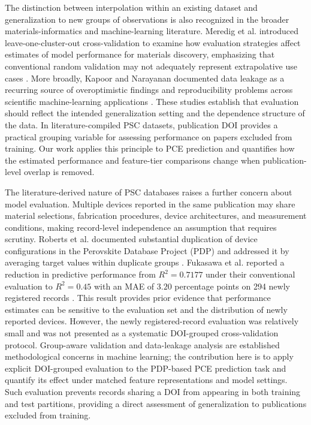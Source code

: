 \documentclass[3p]{elsarticle}
\begin{document}
The distinction between interpolation within an existing dataset and generalization to new groups of observations is also recognized in the broader materials-informatics and machine-learning literature. Meredig et al. introduced leave-one-cluster-out cross-validation to examine how evaluation strategies affect estimates of model performance for materials discovery, emphasizing that conventional random validation may not adequately represent extrapolative use cases \cite{meredig2018cluster}. More broadly, Kapoor and Narayanan documented data leakage as a recurring source of overoptimistic findings and reproducibility problems across scientific machine-learning applications \cite{kapoor2023leakage}. These studies establish that evaluation should reflect the intended generalization setting and the dependence structure of the data. In literature-compiled PSC datasets, publication DOI provides a practical grouping variable for assessing performance on papers excluded from training. Our work applies this principle to PCE prediction and quantifies how the estimated performance and feature-tier comparisons change when publication-level overlap is removed.

The literature-derived nature of PSC databases raises a further concern about model evaluation. Multiple devices reported in the same publication may share material selections, fabrication procedures, device architectures, and measurement conditions, making record-level independence an assumption that requires scrutiny. Roberts et al. documented substantial duplication of device configurations in the Perovskite Database Project (PDP) and addressed it by averaging target values within duplicate groups \cite{roberts2024machine}. Fukasawa et al. reported a reduction in predictive performance from \(R^2=0.7177\) under their conventional evaluation to \(R^2=0.45\) with an MAE of \(3.20\) percentage points on 294 newly registered records \cite{fukasawa2024effectiveness}. This result provides prior evidence that performance estimates can be sensitive to the evaluation set and the distribution of newly reported devices. However, the newly registered-record evaluation was relatively small and was not presented as a systematic DOI-grouped cross-validation protocol. Group-aware validation and data-leakage analysis are established methodological concerns in machine learning; the contribution here is to apply explicit DOI-grouped evaluation to the PDP-based PCE prediction task and quantify its effect under matched feature representations and model settings. Such evaluation prevents records sharing a DOI from appearing in both training and test partitions, providing a direct assessment of generalization to publications excluded from training.
\end{document}
